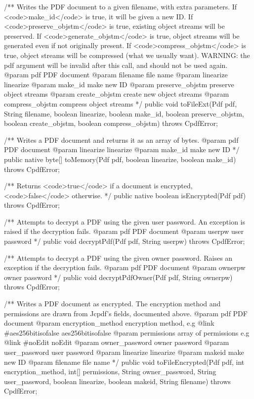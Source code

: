 /** Writes the PDF document to a given filename, with extra parameters. If
<code>make_id</code> is true, it will be given a new ID. If
<code>preserve_objstm</code> is true, existing object streams will be
preserved. If <code>generate_objstm</code> is true, object streams will be
generated even if not originally present. If <code>compress_objstm</code>
is true, object streams will be compressed (what we usually want).
WARNING: the pdf argument will be invalid after this call, and should not
be used again.
@param pdf PDF document
@param filename file name
@param linearize linearize
@param make_id make new ID
@param preserve_objstm preserve object streams
@param create_objstm create new object streams
@param compress_objstm compress object streams
*/
public void toFileExt(Pdf pdf, String filename, boolean linearize,
                      boolean make_id, boolean preserve_objstm,
                      boolean create_objstm, boolean compress_objstm)
    throws CpdfError;

/** Writes a PDF document and returns it as an array of bytes.
@param pdf PDF document
@param linearize linearize
@param make_id make new ID
*/
public native byte[] toMemory(Pdf pdf, boolean linearize, boolean make_id)
    throws CpdfError;

/** Returns <code>true</code> if a document is encrypted,
<code>false</code> otherwise. */
public native boolean isEncrypted(Pdf pdf) throws CpdfError;

/** Attempts to decrypt a PDF using the given
user password. An exception is raised if the decryption fails.
@param pdf PDF document
@param userpw user password */
public void decryptPdf(Pdf pdf, String userpw) throws CpdfError;

/** Attempts to decrypt a PDF using the given owner password. Raises an
exception if the decryption fails.
@param pdf PDF document
@param ownerpw owner password */
public void decryptPdfOwner(Pdf pdf, String ownerpw) throws CpdfError;

/** Writes a PDF document as encrypted. The encryption method and
permissions are drawn from Jcpdf's fields, documented above.
@param pdf PDF document
@param encryption_method encryption method, e.g
  {@link #aes256bitisofalse aes256bitisofalse} 
@param permissions array of permissions e.g {@link #noEdit noEdit}
@param owner_password owner password
@param user_password user password
@param linearize linearize
@param makeid make new ID
@param filename file name */
public void toFileEncrypted(Pdf pdf, int encryption_method,
                            int[] permissions, String owner_password,
                            String user_password, boolean linearize,
                            boolean makeid, String filename)
    throws CpdfError;

